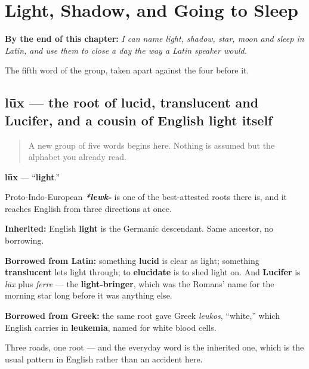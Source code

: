 
\chapter{Light, Shadow, and Going to Sleep}
\label{ch:la-lux}

\begin{chapteropening}
\textbf{By the end of this chapter:} \emph{I can name light, shadow, star, moon and sleep in Latin, and use them to close a day the way a Latin speaker would.}

The fifth word of the group, taken apart against the four before it.
\end{chapteropening}

\section[lūx, lūcis]{lūx — the root of lucid, translucent and Lucifer, and a cousin of English light itself}

\label{lesson:LA-C46-lux}



\begin{quote}
A new group of five words begins here. Nothing is assumed but the alphabet you already read.
\end{quote}

\begin{cousinweb}
\textbf{lūx} — \textquotedblleft{}\textbf{light}.\textquotedblright{}

Proto-Indo-European \emph{\textbf{*lewk-}} is one of the best-attested roots there is, and it reaches English from three directions at once.

\textbf{Inherited:} English \textbf{light} is the Germanic descendant. Same ancestor, no borrowing.

\textbf{Borrowed from Latin:} something \textbf{lucid} is clear as light; something \textbf{translucent} lets light through; to \textbf{elucidate} is to shed light on. And \textbf{Lucifer} is \emph{lūx} plus \emph{ferre} — the \textbf{light-bringer}, which was the Romans' name for the morning star long before it was anything else.

\textbf{Borrowed from Greek:} the same root gave Greek \emph{leukos}, \textquotedblleft{}white,\textquotedblright{} which English carries in \textbf{leukemia}, named for white blood cells.

Three roads, one root — and the everyday word is the inherited one, which is the usual pattern in English rather than an accident here.
\end{cousinweb}

